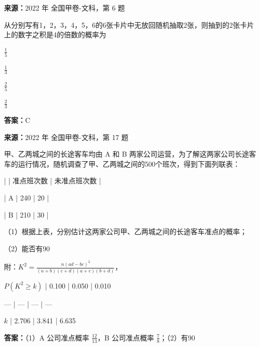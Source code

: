 \begin{question}[points=5]
\textbf{来源：}2022 年 全国甲卷-文科，第 6 题\par
从分别写有1，2，3，4，5，6的6张卡片中无放回随机抽取2张，则抽到的2张卡片上的数字之积是4的倍数的概率为
\begin{choices}
  \item $\frac{1}{5}$
  \item $\frac{1}{3}$
  \item $\frac{2}{5}$
  \item $\frac{2}{3}$
\end{choices}
\begin{solution}
\textbf{答案：}C
\end{solution}
\end{question}

\begin{question}[points=12]
\textbf{来源：}2022 年 全国甲卷-文科，第 17 题\par
甲、乙两城之间的长途客车均由 A 和 B 两家公司运营，为了解这两家公司长途客车的运行情况，随机调查了甲、乙两城之间的500个班次，得到下面列联表：



| | 准点班次数 | 未准点班次数 |

| A | 240 | 20 |

| B | 210 | 30 |



（1）根据上表，分别估计这两家公司甲、乙两城之间的长途客车准点的概率；

（2）能否有90%



附：$K^2=\frac{n(ad-bc)^2}{(a+b)(c+d)(a+c)(b+d)}$，



$P(K^2\ge k)$ | 0.100 | 0.050 | 0.010

--- | --- | --- | ---

$k$ | 2.706 | 3.841 | 6.635
\begin{solution}
\textbf{答案：}（1）A 公司准点概率 $\frac{12}{13}$，B 公司准点概率 $\frac{7}{8}$；（2）有90%
\end{solution}
\end{question}

